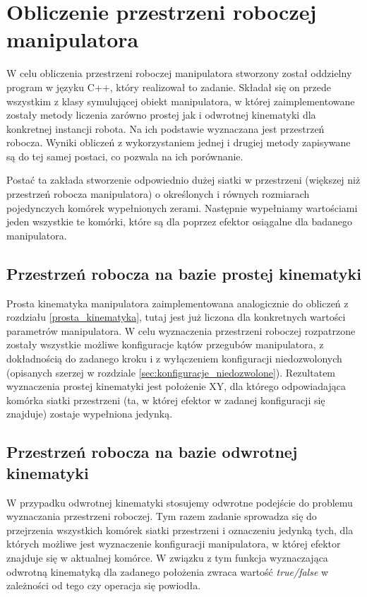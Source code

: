 \documentclass[printmode]{mgr}
\begin{document}
\section{Obliczenie przestrzeni roboczej manipulatora}
W celu obliczenia przestrzeni roboczej manipulatora stworzony został oddzielny program w języku C++, 
który realizował to zadanie. Składał się on przede wszystkim z klasy symulującej obiekt manipulatora, 
w której zaimplementowane zostały metody liczenia zarówno prostej jak i odwrotnej kinematyki dla
konkretnej instancji robota. Na ich podstawie wyznaczana jest przestrzeń robocza. Wyniki obliczeń
z wykorzystaniem jednej i drugiej metody zapisywane są do tej samej postaci, co pozwala na ich porównanie.

Postać ta zakłada stworzenie odpowiednio dużej siatki w przestrzeni (większej niż
przestrzeń robocza manipulatora) o określonych i równych rozmiarach pojedynczych komórek
wypełnionych zerami. Następnie wypełniamy wartościami jeden wszystkie te komórki, które są dla
poprzez efektor osiągalne dla badanego manipulatora. 

\subsection{Przestrzeń robocza na bazie prostej kinematyki}
Prosta kinematyka manipulatora zaimplementowana analogicznie do obliczeń z rozdziału \ref{prosta_kinematyka},
tutaj jest już liczona dla konkretnych wartości parametrów manipulatora. 
W celu wyznaczenia przestrzeni roboczej rozpatrzone zostały wszystkie możliwe konfiguracje
kątów przegubów manipulatora, z dokładnością do zadanego kroku i z wyłączeniem konfiguracji
niedozwolonych (opisanych szerzej w rozdziale \ref{sec:konfiguracje_niedozwolone}).
Rezultatem wyznaczenia prostej kinematyki jest położenie XY, dla którego odpowiadająca komórka
siatki przestrzeni (ta, w której efektor w zadanej konfiguracji się znajduje)
zostaje wypełniona jedynką. 

\subsection{Przestrzeń robocza na bazie odwrotnej kinematyki}
W przypadku odwrotnej kinematyki stosujemy odwrotne podejście do problemu wyznaczania przestrzeni roboczej. 
Tym razem zadanie sprowadza się do przejrzenia wszystkich komórek siatki przestrzeni i oznaczeniu
jedynką tych, dla których możliwe jest wyznaczenie konfiguracji manipulatora, w której efektor
znajduje się w aktualnej komórce. W związku z tym funkcja wyznaczająca odwrotną kinematyką
dla zadanego położenia zwraca wartość \emph{true/false} w zależności od tego czy operacja
się powiodła. 
\end{document}
